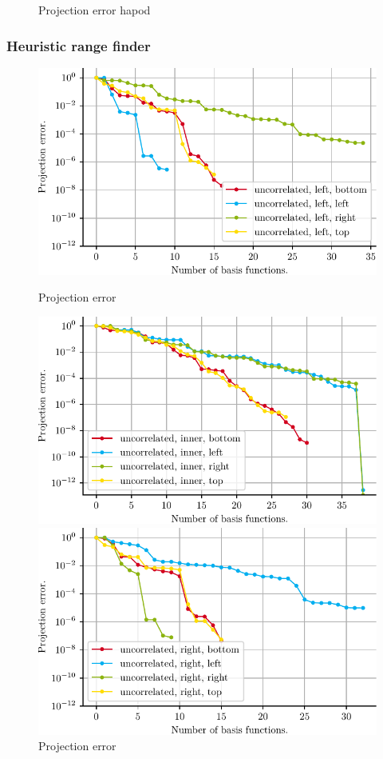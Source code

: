 \documentclass[a4paper]{eccomas_paper-2024}
\begin{document}
\begin{figure}[!htb]
  \caption{Projection error hapod}\label{fig:proj_error_right_hapod}
\endminipage
\end{figure}

\subsubsection{Heuristic range finder}

\begin{figure}[!htb]
  \includegraphics[width=\linewidth]{../figures/beam/fig_proj_error_left_heuristic.pdf}
  \caption{Projection error }\label{fig:proj_error_left_heuristic}
\endminipage\hfill
{}
  \includegraphics[width=\linewidth]{../figures/beam/fig_proj_error_inner_heuristic.pdf}
  \caption{Projection error }\label{fig:proj_error_inner_heuristic}
\endminipage\hfill
{}%
  \includegraphics[width=\linewidth]{../figures/beam/fig_proj_error_right_heuristic.pdf}

\end{figure}
\end{document}
